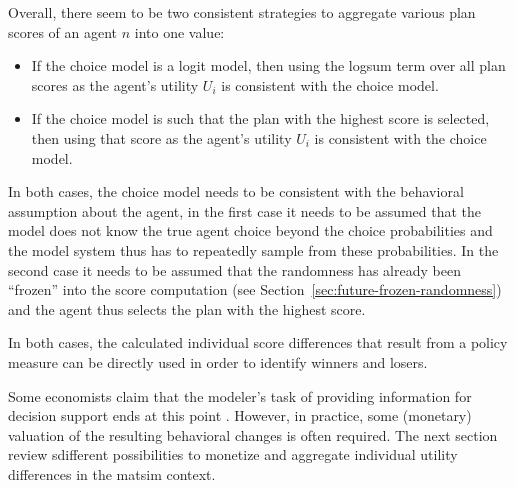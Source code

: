 Overall, there seem to be two consistent strategies to aggregate various plan scores of an agent $n$ into one value:
\begin{itemize}\styleItemize

\item If the choice model is a logit model, then using the logsum term over all plan scores as the agent's utility $U_i$ is consistent with the choice model.

\item If the choice model is such that the plan with the highest score is selected, then using that score as the agent's utility $U_i$ is consistent with the choice model.

\end{itemize}
In both cases, the choice model needs to be consistent with the behavioral assumption about the agent, \ie in the first case it needs to be assumed that the model does not know the true agent choice beyond the choice probabilities and the model system thus has to repeatedly sample from these probabilities.  In the second case it needs to be assumed that the randomness has already been ``frozen'' into the score computation (see Section~\ref{sec:future-frozen-randomness}) and the agent thus selects the plan with the highest score.
%

%
In both cases, the calculated individual score differences that result from a policy measure can be directly used in order to identify winners and losers.
%

Some economists claim that the modeler's task of providing information for decision support ends at this point \citep{AhlheimRose1989MessungIndividuellerWohlfahrt}. However, in practice, some (monetary) valuation of the resulting behavioral changes is often required. The next section review sdifferent possibilities to monetize and aggregate individual utility differences in the \acrshort{matsim} context.

